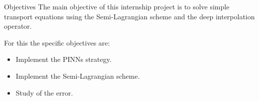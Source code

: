 \begin{frame}{Objectives}
  The main objective of this internship project is to solve simple transport equations using the Semi-Lagrangian scheme and the deep interpolation operator.
  
  \vspace{0.5cm}

  For this the specific objectives are: \\

  \vspace{0.3cm}

  \begin{itemize}
    \item Implement the PINNs strategy. 
    \item Implement the Semi-Lagrangian scheme.
    \item Study of the error. 
  \end{itemize}

\end{frame}

